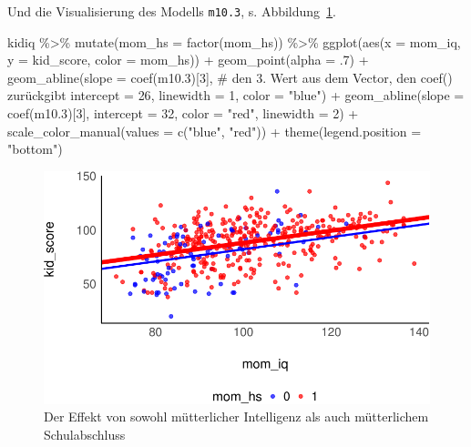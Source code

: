 \documentclass[
  a4paper,
  DIV=11]{scrreprt}
\newenvironment{Shaded}{\begin{snugshade}}{\end{snugshade}}
\newcommand{\AttributeTok}[1]{\textcolor[rgb]{0.40,0.45,0.13}{#1}}
\newcommand{\CommentTok}[1]{\textcolor[rgb]{0.37,0.37,0.37}{#1}}
\newcommand{\DecValTok}[1]{\textcolor[rgb]{0.68,0.00,0.00}{#1}}
\newcommand{\FloatTok}[1]{\textcolor[rgb]{0.68,0.00,0.00}{#1}}
\newcommand{\FunctionTok}[1]{\textcolor[rgb]{0.28,0.35,0.67}{#1}}
\newcommand{\NormalTok}[1]{\textcolor[rgb]{0.00,0.23,0.31}{#1}}
\newcommand{\SpecialCharTok}[1]{\textcolor[rgb]{0.37,0.37,0.37}{#1}}
\newcommand{\StringTok}[1]{\textcolor[rgb]{0.13,0.47,0.30}{#1}}
\theoremstyle{definition}
\theoremstyle{remark}
\begin{document}
Und die Visualisierung des Modells \texttt{m10.3}, s.
Abbildung~\ref{fig-m103}.

\begin{Shaded}
\begin{Highlighting}[]
\NormalTok{kidiq }\SpecialCharTok{\%\textgreater{}\%} 
  \FunctionTok{mutate}\NormalTok{(}\AttributeTok{mom\_hs =} \FunctionTok{factor}\NormalTok{(mom\_hs)) }\SpecialCharTok{\%\textgreater{}\%}  
  \FunctionTok{ggplot}\NormalTok{(}\FunctionTok{aes}\NormalTok{(}\AttributeTok{x =}\NormalTok{ mom\_iq, }\AttributeTok{y =}\NormalTok{ kid\_score, }\AttributeTok{color =}\NormalTok{ mom\_hs)) }\SpecialCharTok{+}
  \FunctionTok{geom\_point}\NormalTok{(}\AttributeTok{alpha =}\NormalTok{ .}\DecValTok{7}\NormalTok{) }\SpecialCharTok{+}
  \FunctionTok{geom\_abline}\NormalTok{(}\AttributeTok{slope =} \FunctionTok{coef}\NormalTok{(m10}\FloatTok{.3}\NormalTok{)[}\DecValTok{3}\NormalTok{],  }\CommentTok{\# den 3. Wert aus dem Vector, den \textasciigrave{}coef()\textasciigrave{} zurückgibt}
              \AttributeTok{intercept =} \DecValTok{26}\NormalTok{,}
              \AttributeTok{linewidth =} \DecValTok{1}\NormalTok{,}
              \AttributeTok{color =} \StringTok{"blue"}\NormalTok{) }\SpecialCharTok{+}
  \FunctionTok{geom\_abline}\NormalTok{(}\AttributeTok{slope =} \FunctionTok{coef}\NormalTok{(m10}\FloatTok{.3}\NormalTok{)[}\DecValTok{3}\NormalTok{],}
              \AttributeTok{intercept =} \DecValTok{32}\NormalTok{,}
              \AttributeTok{color =} \StringTok{"red"}\NormalTok{,}
              \AttributeTok{linewidth =} \DecValTok{2}\NormalTok{) }\SpecialCharTok{+}
  \FunctionTok{scale\_color\_manual}\NormalTok{(}\AttributeTok{values =} \FunctionTok{c}\NormalTok{(}\StringTok{"blue"}\NormalTok{, }\StringTok{"red"}\NormalTok{)) }\SpecialCharTok{+}
  \FunctionTok{theme}\NormalTok{(}\AttributeTok{legend.position =} \StringTok{"bottom"}\NormalTok{)}
\end{Highlighting}
\end{Shaded}

\begin{figure}[H]

{\centering \includegraphics{./metrische-AV_files/figure-pdf/fig-m103-1.pdf}

}

\caption{\label{fig-m103}Der Effekt von sowohl mütterlicher Intelligenz
als auch mütterlichem Schulabschluss}

\end{figure}
\end{document}
